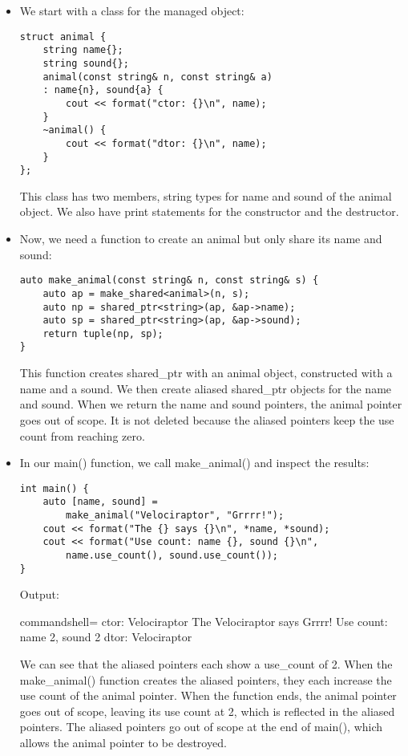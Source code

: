 \begin{itemize}
\item 
We start with a class for the managed object:

\begin{lstlisting}[style=styleCXX]
struct animal {
	string name{};
	string sound{};
	animal(const string& n, const string& a)
	: name{n}, sound{a} {
		cout << format("ctor: {}\n", name);
	}
	~animal() {
		cout << format("dtor: {}\n", name);
	}
};
\end{lstlisting}

This class has two members, string types for name and sound of the animal object. We also have print statements for the constructor and the destructor.

\item 
Now, we need a function to create an animal but only share its name and sound:

\begin{lstlisting}[style=styleCXX]
auto make_animal(const string& n, const string& s) {
	auto ap = make_shared<animal>(n, s);
	auto np = shared_ptr<string>(ap, &ap->name);
	auto sp = shared_ptr<string>(ap, &ap->sound);
	return tuple(np, sp);
}
\end{lstlisting}

This function creates shared\_ptr with an animal object, constructed with a name and a sound. We then create aliased shared\_ptr objects for the name and sound. When we return the name and sound pointers, the animal pointer goes out of scope. It is not deleted because the aliased pointers keep the use count from reaching zero.

\item 
In our main() function, we call make\_animal() and inspect the results:

\begin{lstlisting}[style=styleCXX]
int main() {
	auto [name, sound] =
		make_animal("Velociraptor", "Grrrr!");
	cout << format("The {} says {}\n", *name, *sound);
	cout << format("Use count: name {}, sound {}\n",
		name.use_count(), sound.use_count());
}
\end{lstlisting}

Output:

\begin{tcblisting}{commandshell={}}
ctor: Velociraptor
The Velociraptor says Grrrr!
Use count: name 2, sound 2
dtor: Velociraptor
\end{tcblisting}

We can see that the aliased pointers each show a use\_count of 2. When the make\_animal() function creates the aliased pointers, they each increase the use count of the animal pointer. When the function ends, the animal pointer goes out of scope, leaving its use count at 2, which is reflected in the aliased pointers. The aliased pointers go out of scope at the end of main(), which allows the animal pointer to be destroyed.

\end{itemize}

